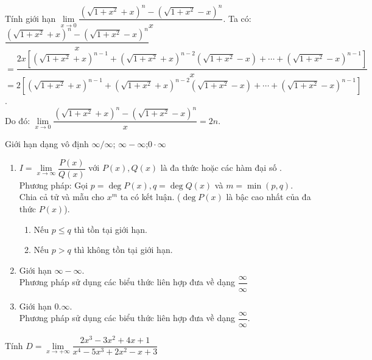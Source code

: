 \begin{bt}%
Tính giới hạn $\lim\limits_{x \to 0}\dfrac{(\sqrt{1+x^2}+x)^n - (\sqrt{1+x^2}-x)^n}{x}$.
\loigiai
{
Ta có:\\ 
$\dfrac{(\sqrt{1+x^2}+x)^n - (\sqrt{1+x^2}-x)^n}{x} $\\
$= \dfrac{2x\left[\left(\sqrt{1+x^2}+x\right)^{n-1}+\left(\sqrt{1+x^2}+x\right)^{n-2}\left(\sqrt{1+x^2}-x\right)+\cdots + \left(\sqrt{1+x^2}-x\right)^{n-1}\right]}{x}$\\
$= 2\left[\left(\sqrt{1+x^2}+x\right)^{n-1}+\left(\sqrt{1+x^2}+x\right)^{n-2}\left(\sqrt{1+x^2}-x\right)+\cdots + \left(\sqrt{1+x^2}-x\right)^{n-1}\right]$.\\
Do đó: $\lim\limits_{x \to 0}\dfrac{(\sqrt{1+x^2}+x)^n - (\sqrt{1+x^2}-x)^n}{x} = 2n$.
}
\end{bt}

\begin{dang}{Giới hạn dạng vô định $\infty/\infty$; $\infty -\infty$;$0\cdot\infty$}
\begin{enumerate}[Dạng 1:]
\item $I=\lim\limits_{x\to \infty}\dfrac{P(x)}{Q(x)}$ với $P(x),Q(x)$ là đa thức hoặc các hàm đại số .\\
Phương pháp: Gọi $p=\deg P(x),q=\deg Q(x)$ và $m=\min(p,q)$. Chia cả tử và mẫu cho $x^m$ ta có kết luận. ($\deg P(x)$ là bậc cao nhất của đa thức $P(x)$).
\begin{enumerate}[+]
\item Nếu $p\leq q$ thì tồn tại giới hạn.
\item Nếu $p>q$ thì không tồn tại giới hạn.
\end{enumerate}
\item Giới hạn $\infty -\infty$.\\
Phương pháp sử dụng các biểu thức liên hợp đưa về dạng $\dfrac{\infty}{\infty}$
\item Giới hạn $0.\infty $.\\
Phương pháp sử dụng các biểu thức liên hợp đưa về dạng $\dfrac{\infty }{\infty }$.
\end{enumerate}
\end{dang}

\begin{vd}%
Tính $D=\lim\limits_{x\to +\infty}\dfrac{2x^3-3x^2+4x+1}{x^4-5x^3+2x^2-x+3}$
\end{vd}


